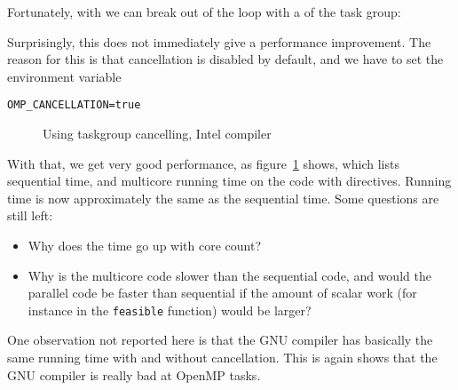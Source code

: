 Fortunately, with  we can break out of the loop
with a  of the task group:
%

Surprisingly, this does not immediately give a performance improvement.
The reason for this is that cancellation is disabled by default,
and we have to set the environment variable
\begin{verbatim}
OMP_CANCELLATION=true
\end{verbatim}

\begin{figure}
  \caption{Using taskgroup cancelling, Intel compiler}
  \label{fig:omp-dfs-cancel}
\end{figure}

With that, we get very good performance,
as  figure~\ref{fig:omp-dfs-cancel} shows,
which lists sequential time, and
multicore running time on the code with  directives.
Running time is now approximately the same as the sequential time.
Some questions are still left:
\begin{itemize}
\item Why does the time go up with core count?
\item Why is the multicore code slower than the sequential code,
  and would the parallel code be faster than sequential if the
  amount of scalar work (for instance in the \lstinline{feasible} function)
  would be larger?
\end{itemize}

One observation not reported here
is that the GNU compiler has basically the same running time with and without cancellation.
This is again shows that the GNU compiler is really bad at OpenMP tasks.


